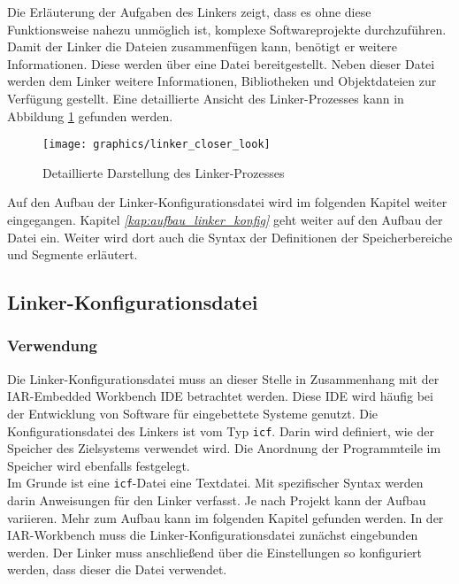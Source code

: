 Die Erläuterung der Aufgaben des Linkers zeigt, dass es ohne diese Funktionsweise nahezu unmöglich ist, komplexe Softwareprojekte durchzuführen.
Damit der Linker die Dateien zusammenfügen kann, benötigt er weitere Informationen.
Diese werden über eine Datei bereitgestellt.
Neben dieser Datei werden dem Linker weitere Informationen, Bibliotheken und Objektdateien zur Verfügung gestellt.
Eine detaillierte Ansicht des Linker-Prozesses kann in Abbildung \ref{fig:linkercloserlook} gefunden werden.\\

\begin{figure}[H]
	\centering
	\texttt{[image: graphics/linker\_closer\_look]}
	\caption[Detaillierte Darstellung des Linker-Prozesses]{Detaillierte Darstellung des Linker-Prozesses \cite{iar_guide}}
	\label{fig:linkercloserlook}
\end{figure}

Auf den Aufbau der Linker-Konfigurationsdatei wird im folgenden Kapitel weiter eingegangen.
Kapitel \textit{\ref{kap:aufbau_linker_konfig} } geht weiter auf den Aufbau der Datei ein.
Weiter wird dort auch die Syntax der Definitionen der Speicherbereiche und Segmente erläutert. 

\subsection{Linker-Konfigurationsdatei}\label{kap:linker_konfigurationsdatei}

\subsubsection{Verwendung}\label{kap:linker_konfig_verwendung}
Die Linker-Konfigurationsdatei muss an dieser Stelle in Zusammenhang mit der IAR-Embedded Workbench \ac{IDE} betrachtet werden.
Diese \ac{IDE} wird häufig bei der Entwicklung von Software für eingebettete Systeme genutzt.
Die Konfigurationsdatei des Linkers ist vom Typ \verb*|icf|.
Darin wird definiert, wie der Speicher des Zielsystems verwendet wird.
Die Anordnung der Programmteile im Speicher wird ebenfalls festgelegt.\\

Im Grunde ist eine \verb*|icf|-Datei eine Textdatei.
Mit spezifischer Syntax werden darin Anweisungen für den Linker verfasst.
Je nach Projekt kann der Aufbau variieren.
Mehr zum Aufbau kann im folgenden Kapitel gefunden werden.
In der IAR-Workbench muss die Linker-Konfigurationsdatei zunächst eingebunden werden.
Der Linker muss anschließend über die Einstellungen so konfiguriert werden, dass dieser die Datei verwendet. \\

